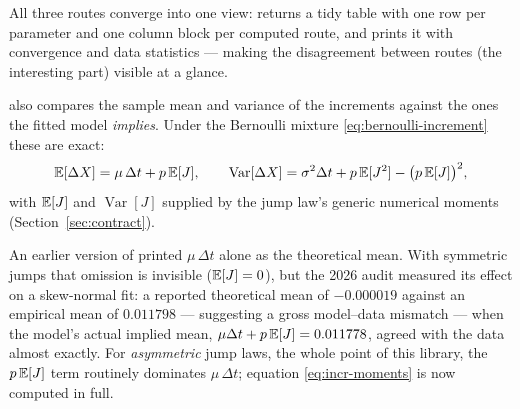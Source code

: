All three routes converge into one view:  returns a tidy
table with one row per parameter and one column block per computed route,
and  prints it with convergence and data statistics
--- making the disagreement between routes (the interesting part) visible
at a glance.

 also compares the sample mean and variance of the
increments against the ones the fitted model \emph{implies}. Under the
Bernoulli mixture \eqref{eq:bernoulli-increment} these are exact:
\begin{equation}
  \mathbb{E}[\Delta X] = \mu\,\Delta t + p\,\mathbb{E}[J],
  \qquad
  \operatorname{Var}[\Delta X]
  = \sigma^2 \Delta t + p\,\mathbb{E}[J^2] - \bigl(p\,\mathbb{E}[J]\bigr)^2,
  \label{eq:incr-moments}
\end{equation}
with $\mathbb{E}[J]$ and $\operatorname{Var}[J]$ supplied by the jump law's
generic numerical moments (Section~\ref{sec:contract}).

\begin{remark}
An earlier version of  printed $\mu\,\Delta t$ alone
as the theoretical mean. With symmetric jumps that omission is invisible
($\mathbb{E}[J]=0$), but the 2026 audit measured its effect on a skew-normal fit:
a reported theoretical mean of $-0.000019$ against an empirical mean of
$0.011798$ --- suggesting a gross model--data mismatch --- when the
model's actual implied mean, $\mu\Delta t + p\,\mathbb{E}[J] = 0.011778$, agreed
with the data almost exactly. For \emph{asymmetric} jump laws, the whole
point of this library, the $p\,\mathbb{E}[J]$ term routinely dominates
$\mu\,\Delta t$; equation \eqref{eq:incr-moments} is now computed in
full.
\end{remark}

